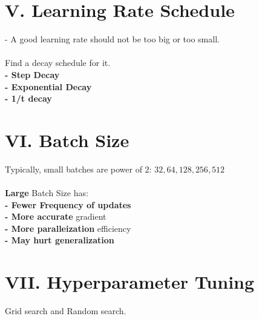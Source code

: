 \documentclass{article}
\begin{document}
\section*{V. Learning Rate Schedule}
- A good learning rate should not be too big or too small. \\
\\
Find a decay schedule for it. \\
\textbf{- Step Decay} \\
\textbf{- Exponential Decay} \\
\textbf{- 1/t decay}

\section*{VI. Batch Size}
Typically, small batches are power of $2$: $32, 64, 128, 256, 512$ \\
\\
\textbf{Large} Batch Size has: \\
\textbf{- Fewer Frequency of updates} \\
\textbf{- More accurate} gradient \\
\textbf{- More paralleization} efficiency \\
\textbf{- May hurt generalization}

\section*{VII. Hyperparameter Tuning}
Grid search and Random search.
\end{document}
